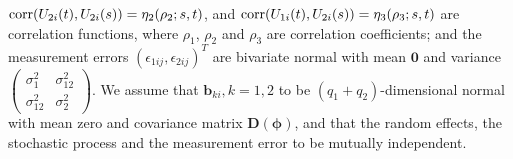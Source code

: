 \documentclass[article,lineno]{biometrika}
\begin{document}
${\rm corr} (U_{2i}(t), U_{2i}(s)) = \eta_2(\rho_2; s, t)$, 
and ${\rm corr} (U_{1i}(t), U_{2i}(s)) = \eta_3(\rho_3; s, t)$
 are correlation functions, where 
$\rho_1$,  $\rho_2$ and $\rho_3$ 
are correlation coefficients; 
and 
the measurement errors $(\epsilon_{1ij}, \epsilon_{2ij})^T$ are bivariate  normal with mean $\bm 0$ and variance $  \begin{pmatrix}
  \sigma_1^2 &  \sigma_{12}^2  \\
\sigma_{12}^2 &   \sigma_2^2 
 \end{pmatrix}$.
We assume that $\bm b_{ki}, k = 1, 2$ to be  $(q_1 + q_2)$-dimensional normal  with mean zero and covariance matrix $\boldsymbol D(\boldsymbol \phi)$,   
and that the random effects, the stochastic process and the measurement error to be mutually independent. 
\end{document}
